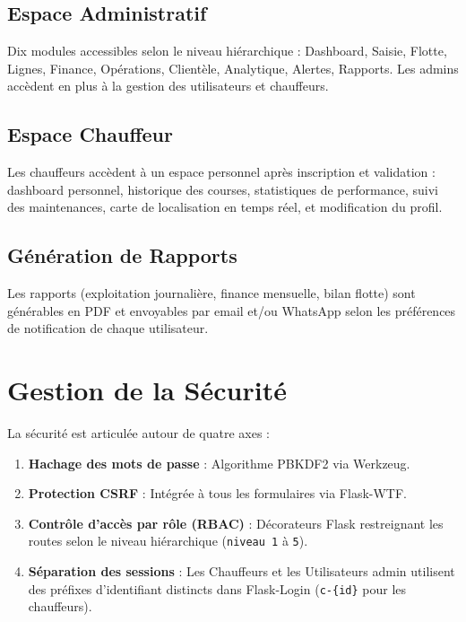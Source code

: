 \documentclass[12pt,a4paper]{report}
\begin{document}
\section{Espace Administratif}
Dix modules accessibles selon le niveau hiérarchique :
Dashboard, Saisie, Flotte, Lignes, Finance, Opérations, Clientèle, Analytique,
Alertes, Rapports. Les admins accèdent en plus à la gestion des utilisateurs et chauffeurs.

\section{Espace Chauffeur}
Les chauffeurs accèdent à un espace personnel après inscription et validation :
dashboard personnel, historique des courses, statistiques de performance,
suivi des maintenances, carte de localisation en temps réel, et modification du profil.

\section{Génération de Rapports}
Les rapports (exploitation journalière, finance mensuelle, bilan flotte) sont
générables en PDF et envoyables par email et/ou WhatsApp selon les préférences
de notification de chaque utilisateur.

\chapter{Gestion de la Sécurité}

La sécurité est articulée autour de quatre axes :

\begin{enumerate}[leftmargin=1.5cm]
    \item \textbf{Hachage des mots de passe} : Algorithme PBKDF2 via Werkzeug.
    \item \textbf{Protection CSRF} : Intégrée à tous les formulaires via Flask-WTF.
    \item \textbf{Contrôle d'accès par rôle (RBAC)} : Décorateurs Flask restreignant
          les routes selon le niveau hiérarchique (\texttt{niveau 1} à \texttt{5}).
    \item \textbf{Séparation des sessions} : Les Chauffeurs et les Utilisateurs admin
          utilisent des préfixes d'identifiant distincts dans Flask-Login
          (\texttt{c-\{id\}} pour les chauffeurs).
\end{enumerate}
\end{document}
